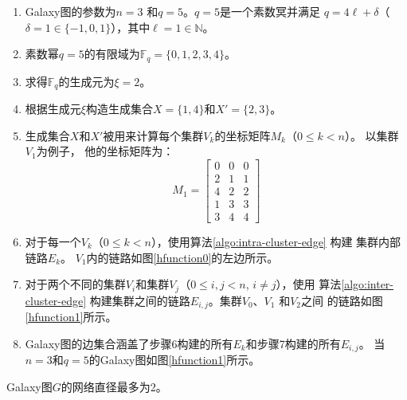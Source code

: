 \begin{enumerate}
\item Galaxy图的参数为$n=3$ 和$q=5$。$q=5$是一个素数冥并满足
  $q=4\ell+\delta$（$\delta = 1 \in \{-1,0,1\}$），其中$\ell = 1 \in \mathds{N}$。
\item 素数幂$q=5$的有限域为$\mathds{F}_q = \{0,1,2,3,4\}$。
\item 求得$\mathds{F}_q$的生成元为$\xi = 2$。
\item 根据生成元$\xi$构造生成集合$X=\{1,4\}$和$X'=\{2,3\}$。
\item 生成集合$X$和$X'$被用来计算每个集群$V_k$的坐标矩阵$M_k$（$0 \le k < n$）。
  以集群$V_1$为例子， 他的坐标矩阵为：
  \begin{equation*}
  M_1 =
  \begin{bmatrix}
  0 & 0 & 0 \\
  2 & 1 & 1 \\
  4 & 2 & 2 \\
  1 & 3 & 3 \\
  3 & 4 & 4
  \end{bmatrix}
  \end{equation*}
\item 对于每一个$V_k$（$0 \le k < n$），使用算法\ref{algo:intra-cluster-edge} 构建
集群内部链路$E_k$。 $V_1$内的链路如图\ref{hfunction0}的左边所示。
\item 对于两个不同的集群$V_i$和集群$V_j$（$0 \le i,j < n$, $i \ne j$），使用
算法\ref{algo:inter-cluster-edge} 构建集群之间的链路$E_{i,j}$。集群$V_0$、$V_1$ 和$V_2$之间
的链路如图\ref{hfunction1}所示。
\item Galaxy图的边集合涵盖了步骤6构建的所有$E_k$和步骤7构建的所有$E_{i,j}$。
当$n = 3$和$q = 5$的Galaxy图如图\ref{hfunction1}所示。
\end{enumerate}

\begin{theorem}
\label{proofgalaxygraph}
Galaxy图$G$的网络直径最多为2。
\end{theorem}


